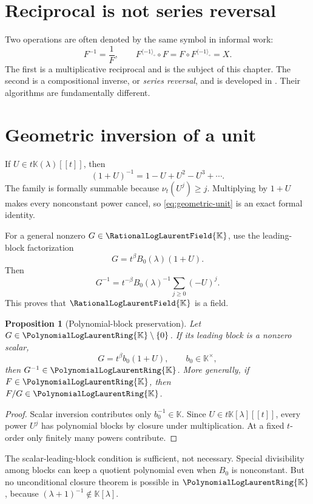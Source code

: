\documentclass[11pt,openany]{book}
\theoremstyle{definition}
\theoremstyle{plain}
\newtheorem{proposition}{Proposition}[chapter]
\theoremstyle{remark}
\newcommand{\K}{\mathbb{K}}
\newcommand{\Plog}{\PolynomialLogLaurentRing{\K}}
\newcommand{\Rlog}{\RationalLogLaurentField{\K}}
\newcommand{\invcomp}{^{\langle -1\rangle_{\circ}}}
\newcommand{\val}{\nu}
\begin{document}
\section{Reciprocal is not series reversal}
Two operations are often denoted by the same symbol in informal work:
\[
 F^{-1}=\frac1F,
 \qquad
 F\invcomp\circ F=F\circ F\invcomp=X.
\]
The first is a multiplicative reciprocal and is the subject of this chapter. The second is a compositional inverse, or \emph{series reversal}, and is developed in . Their algorithms are fundamentally different.

\section{Geometric inversion of a unit}
If \(U\in t\K(\lambda)[[t]]\), then
\begin{equation}\label{eq:geometric-unit}
 (1+U)^{-1}=1-U+U^2-U^3+\cdots.
\end{equation}
The family is formally summable because \(\val_t(U^j)\ge j\). Multiplying by \(1+U\) makes every nonconstant power cancel, so \cref{eq:geometric-unit} is an exact formal identity.

For a general nonzero \(G\in\Rlog\), use the leading-block factorization
\[
 G=t^\beta B_0(\lambda)(1+U).
\]
Then
\begin{equation}\label{eq:general-reciprocal}
 G^{-1}=t^{-\beta}B_0(\lambda)^{-1}
 \sum_{j\ge0}(-U)^j.
\end{equation}
This proves that \(\Rlog\) is a field.

\begin{proposition}[Polynomial-block preservation]\label{prop:poly-division}
Let \(G\in\Plog\setminus\{0\}\). If its leading block is a nonzero scalar,
\[
 G=t^\beta b_0(1+U),\qquad b_0\in\K^\times,
\]
then \(G^{-1}\in\Plog\). More generally, if \(F\in\Plog\), then \(F/G\in\Plog\).
\end{proposition}

\begin{proof}
Scalar inversion contributes only \(b_0^{-1}\in\K\). Since \(U\in t\K[\lambda][[t]]\), every power \(U^j\) has polynomial blocks by closure under multiplication. At a fixed \(t\)-order only finitely many powers contribute.
\end{proof}

The scalar-leading-block condition is sufficient, not necessary. Special divisibility among blocks can keep a quotient polynomial even when \(B_0\) is nonconstant. But no unconditional closure theorem is possible in \(\Plog\), because \((\lambda+1)^{-1}\notin\K[\lambda]\).
\end{document}

